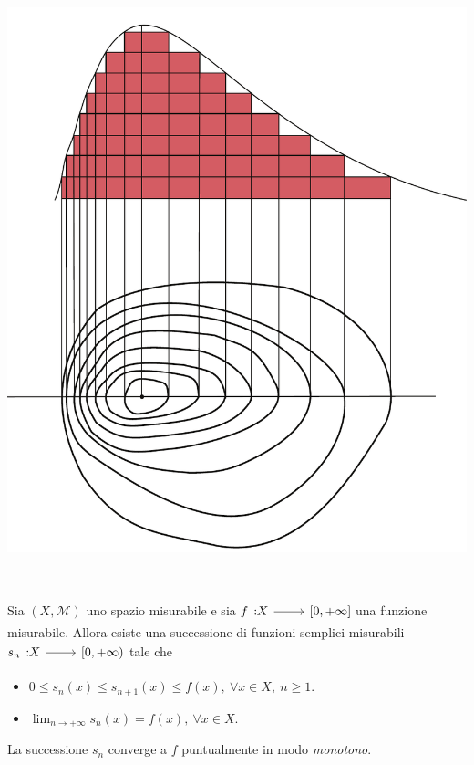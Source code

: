 \begin{minipage}{0.4\textwidth}
	\includegraphics[trim=1cm 0cm 1.5cm 0cm, clip, scale=0.4]{images/isoipse}
\end{minipage}\vspace{3mm}\\
\begin{theorema}
	Sia $\left(X,\mathcal{M}\right)$ uno spazio misurabile e sia $\funz{f}{X}{\left[0,+\infty\right]}$ una funzione misurabile. Allora esiste una successione di funzioni semplici misurabili $\funz{s_n}{X}{\left[0,+\infty\right)}$ tale che
	\begin{itemize}
		\item $0\leq s_n(x)\leq s_{n+1}(x)\leq f(x),\ \forall x\in X,\ n\geq 1$.
		\item $\displaystyle\lim_{n\to+\infty}s_n(x)=f(x),\ \forall x\in X$.
	\end{itemize}
\end{theorema}
\begin{observe}
	La successione $s_n$ converge a $f$ puntualmente in modo \textit{monotono}.
\end{observe}
